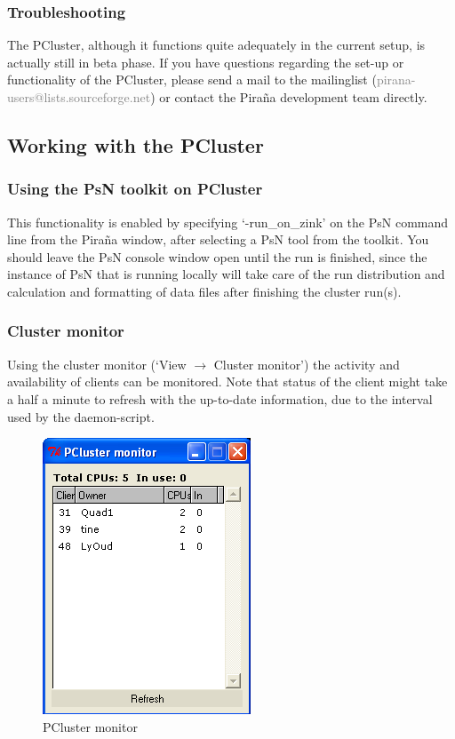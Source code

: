 \documentclass[a4,11pt]{report} \usepackage[pdftex]{graphicx}
\begin{document}
{{{{\subsubsection*{Troubleshooting} The PCluster, although it functions
quite adequately in the current setup, is actually still in beta
phase. If you have questions regarding the set-up or functionality of
the PCluster, please send a mail to the mailinglist
(\textcolor{Grey}{pirana-users@lists.sourceforge.net}) or contact the
Pira\~na development team directly.

\pagebreak
\subsection{Working with the PCluster}

\subsubsection*{Using the PsN toolkit on PCluster} This functionality
is enabled by specifying `-run\_on\_zink' on the PsN command line from
the Pira\~na window, after selecting a PsN tool from the toolkit. You
should leave the PsN console window open until the run is finished,
since the instance of PsN that is running locally will take care of
the run distribution and calculation and formatting of data files
after finishing the cluster run(s).

\subsubsection*{Cluster monitor} Using the cluster monitor (`View
$\rightarrow$ Cluster monitor') the activity and availability of
clients can be monitored. Note that status of the client might take a
half a minute to refresh with the up-to-date information, due to the
interval used by the daemon-script.  \vspace{10pt}

\begin{figure}[hbt] \centering
    \includegraphics[scale=0.5]{images/pcluster.png}
    \caption{PCluster monitor}
\end{figure}

}}}}
\end{document}
